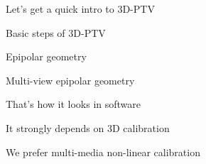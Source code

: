 \begin{frame}[label=ptv-4]{Let's get a quick intro to 3D-PTV}
\end{frame}


\begin{frame}[label=ptv-5]{Basic steps of 3D-PTV}
    \centering{}
\end{frame}


\begin{frame}[label=ptv-6]{Epipolar geometry}
    \centering{}
\end{frame}

\begin{frame}[label=ptv-7]{Multi-view epipolar geometry}
    \centering{}
\end{frame}

\begin{frame}[label=ptv-8]{That's how it looks in software}
    \centering{}
\end{frame}

\begin{frame}[label=ptv-9]{It strongly depends on 3D calibration}
    \centering{}
\end{frame}


\begin{frame}[label=ptv-9]{We prefer multi-media non-linear calibration}
    \centering{}
\end{frame}

